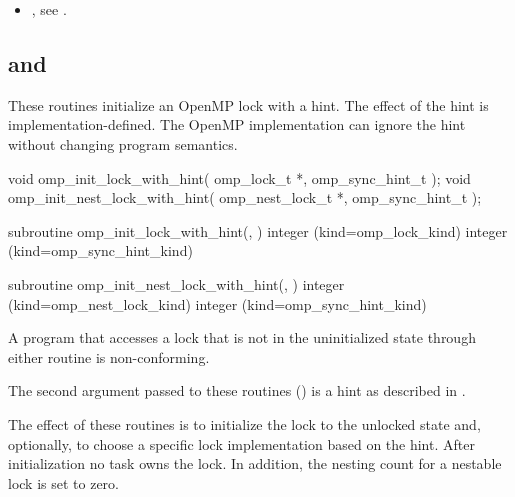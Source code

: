 \crossreferences
\begin{itemize}
\item {}, see
.
\end{itemize}



\subsection[\hcode{omp_init_lock_with_hint} and \\
\hcode{omp_init_nest_lock_with_hint}]{ and \\
}
\label{subsec:omp_init_lock_with_hint and omp_init_nest_lock_with_hint}
\summary
These routines initialize an OpenMP lock with a hint.
The effect of the hint is implementation-defined. The OpenMP implementation
can ignore the hint without changing program semantics.


\format
\begin{ccppspecific}
\begin{ompcFunction}
void omp_init_lock_with_hint(
  omp_lock_t *,
  omp_sync_hint_t 
);
void omp_init_nest_lock_with_hint(
  omp_nest_lock_t *,
  omp_sync_hint_t 
);
\end{ompcFunction}
\end{ccppspecific}


\begin{fortranspecific}
\begin{ompfSubroutine}
subroutine omp_init_lock_with_hint(, )
integer (kind=omp_lock_kind) 
integer (kind=omp_sync_hint_kind) 

subroutine omp_init_nest_lock_with_hint(, )
integer (kind=omp_nest_lock_kind) 
integer (kind=omp_sync_hint_kind) 
\end{ompfSubroutine}
\end{fortranspecific}

\constraints
A program that accesses a lock that is not in the uninitialized state through either routine
is non-conforming.

The second argument passed to these routines () is a hint
as described in .

\effect
The effect of these routines is to initialize the lock to the unlocked state and, optionally, to choose a specific lock implementation based on the hint.
After initialization no task owns the lock. In addition, the nesting count for a nestable lock is set to zero.

